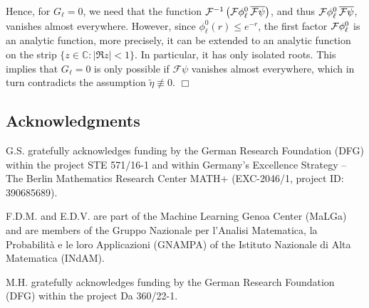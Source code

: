 \documentclass[a4paper,11pt,DIV=11,%
abstract=on%
]{scrartcl}
\def\cf{{\mathcal F}}
\def\C{{\mathbb C}}
\begin{document}
	Hence, for $G_\ell=0$, we need that the function
	${\cal F}^{-1}\left( {\cal F}\phi_{\ell}^0 \,\overline{{\cal F} \psi}\right)$, and thus
	${\cal F}\phi_{\ell}^0 \,\overline{{\cal F} \psi}$, vanishes almost everywhere. However, since
	$\phi_\ell^0(r)\leq e^{-r}$, the first factor ${\cal F}\phi_{\ell}^0$ is an analytic function,
	more precisely, it can be extended to an analytic function on the strip
	$\{z\in\C:|\Re z|<1\}$. 
	In particular, it has only isolated roots. This implies
	that $G_\ell=0$ is only possible if $\cf\psi$ vanishes almost everywhere, which in turn
	contradicts the assumption $\widetilde \eta\not\equiv 0$.
\hfill $\Box$

\subsection*{Acknowledgments} 
G.S. gratefully acknowledges funding by the German Research Foundation (DFG) with\-in the project STE 571/16-1
and within Germany's Excellence Strategy – The Berlin Mathematics Research Center MATH+ 
(EXC-2046/1, project ID: 390685689).

F.D.M. and E.D.V. are part of the Machine Learning Genoa Center (MaLGa) and
are  members of the Gruppo Nazionale per l'Analisi Matematica, la
Probabilit\`a e le loro Applicazioni (GNAMPA) of the Istituto Nazionale
di Alta Matematica (INdAM). 

M.H. gratefully acknowledges funding by the German Research Foundation (DFG) with\-in the project Da 360/22-1.




\end{document}
